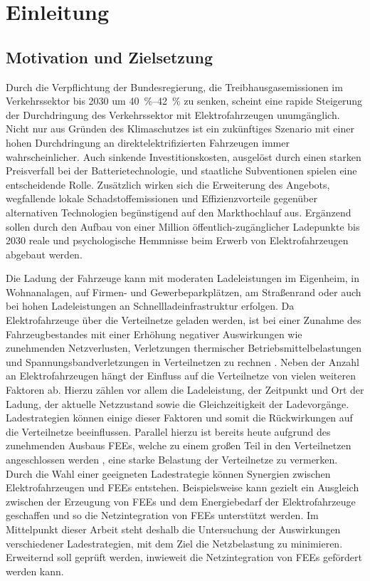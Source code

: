 \section{Einleitung}


\subsection{Motivation und Zielsetzung}

Durch die Verpflichtung der Bundesregierung, die Treibhausgasemissionen im Verkehrssektor bis \num{2030} um \SIrange[range-phrase=~bis~]{40}{42}{\percent} \cite{BundesministeriumUmwelt2019} zu senken, scheint eine rapide Steigerung der Durchdringung des Verkehrssektor mit Elektrofahrzeugen unumgänglich.
Nicht nur aus Gründen des Klimaschutzes ist ein zukünftiges Szenario mit einer hohen Durchdringung an direktelektrifizierten Fahrzeugen immer wahrscheinlicher.
Auch sinkende Investitionskosten, ausgelöst durch einen starken Preisverfall bei der Batterietechnologie, und staatliche Subventionen spielen eine entscheidende Rolle.
Zusätzlich wirken sich die Erweiterung des Angebots, wegfallende lokale Schadstoffemissionen und Effizienzvorteile gegenüber alternativen Technologien begünstigend auf den Markthochlauf aus.
Ergänzend sollen durch den Aufbau von einer Million öffentlich-zugänglicher Ladepunkte bis \num{2030} \cite{DieBundesregierung2019} reale und psychologische Hemmnisse beim Erwerb von Elektrofahrzeugen abgebaut werden.\medskip

Die Ladung der Fahrzeuge kann mit moderaten Ladeleistungen im Eigenheim, in Wohnanalagen, auf Firmen- und Gewerbeparkplätzen, am Straßenrand oder auch bei hohen Ladeleistungen an Schnellladeinfrastruktur erfolgen.
Da Elektrofahrzeuge über die Verteilnetze geladen werden, ist bei einer Zunahme des Fahrzeugbestandes mit einer Erhöhung negativer Auswirkungen wie zunehmenden Netzverlusten, Verletzungen thermischer Betriebsmittelbelastungen und Spannungsbandverletzungen in Verteilnetzen zu rechnen \cite{Dharmakeerthi2011}.
Neben der Anzahl an Elektrofahrzeugen hängt der Einfluss auf die Verteilnetze von vielen weiteren Faktoren ab.
Hierzu zählen vor allem die Ladeleistung, der Zeitpunkt und Ort der Ladung, der aktuelle Netzzustand sowie die Gleichzeitigkeit der Ladevorgänge.
Ladestrategien können einige dieser Faktoren und somit die Rückwirkungen auf die Verteilnetze beeinflussen.
Parallel hierzu ist bereits heute aufgrund des zunehmenden Ausbaus \glspl{FEE}, welche zu einem großen Teil in den Verteilnetzen angeschlossen werden \cite{AgoraEnergiewende2017}, eine starke Belastung der Verteilnetze zu vermerken.
Durch die Wahl einer geeigneten Ladestrategie können Synergien zwischen Elektrofahrzeugen und \glspl{FEE} entstehen.
Beispielsweise kann gezielt ein Ausgleich zwischen der Erzeugung von \glspl{FEE} und dem Energiebedarf der Elektrofahrzeuge geschaffen und so die Netzintegration von \glspl{FEE} unterstützt werden.
Im Mittelpunkt dieser Arbeit steht deshalb die Untersuchung der Auswirkungen verschiedener Ladestrategien, mit dem Ziel die Netzbelastung zu minimieren.
Erweiternd soll geprüft werden, inwieweit die Netzintegration von \glspl{FEE} gefördert werden kann.\medskip

